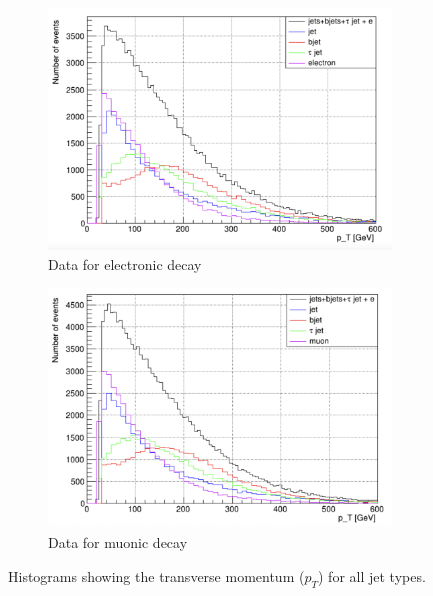 \begin{figure}
    \centering
    \begin{subfigure}{.5\textwidth}
      \centering
      \includegraphics[width=\linewidth]{images/pt-electrons.png}
      \caption{Data for electronic decay}
      \label{fig:sub1}
    \end{subfigure}%
    \begin{subfigure}{.5\textwidth}
      \centering
      \includegraphics[width=\linewidth]{images/pt-muons.png}
      \caption{Data for muonic decay}
      \label{fig:sub2}
    \end{subfigure}
    \caption{Histograms showing the transverse momentum ($p_T$) for all jet types.}
    \label{fig:pT}
\end{figure}

